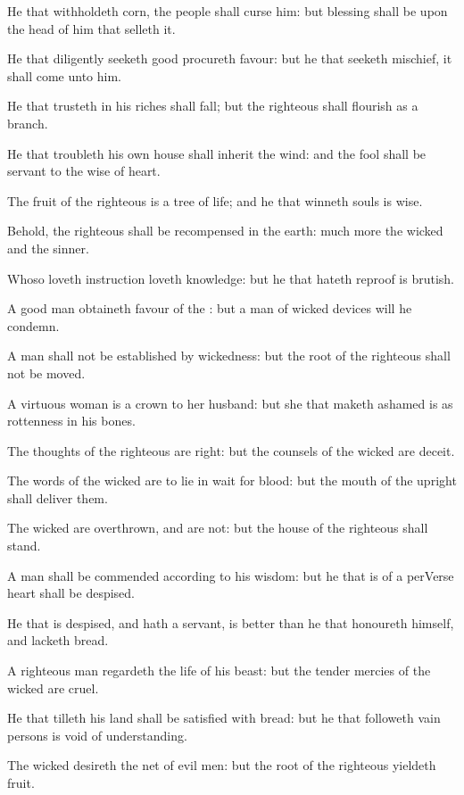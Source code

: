 \Verse He that withholdeth corn, the people shall curse him: but blessing shall be upon the head of him that selleth it.

\Verse He that diligently seeketh good procureth favour: but he that seeketh mischief, it shall come unto him.

\Verse He that trusteth in his riches shall fall; but the righteous shall flourish as a branch.

\Verse He that troubleth his own house shall inherit the wind: and the fool shall be servant to the wise of heart.

\Verse The fruit of the righteous is a tree of life; and he that winneth souls is wise.

\Verse Behold, the righteous shall be recompensed in the earth: much more the wicked and the sinner.


\Chapter
\Verse Whoso loveth instruction loveth knowledge: but he that hateth reproof is brutish.

\Verse A good man obtaineth favour of the \LORD: but a man of wicked devices will he condemn.

\Verse A man shall not be established by wickedness: but the root of the righteous shall not be moved.

\Verse A virtuous woman is a crown to her husband: but she that maketh ashamed is as rottenness in his bones.

\Verse The thoughts of the righteous are right: but the counsels of the wicked are deceit.

\Verse The words of the wicked are to lie in wait for blood: but the mouth of the upright shall deliver them.

\Verse The wicked are overthrown, and are not: but the house of the righteous shall stand.

\Verse A man shall be commended according to his wisdom: but he that is of a perVerse heart shall be despised.

\Verse He that is despised, and hath a servant, is better than he that honoureth himself, and lacketh bread.

\Verse A righteous man regardeth the life of his beast: but the tender mercies of the wicked are cruel.

\Verse He that tilleth his land shall be satisfied with bread: but he that followeth vain persons is void of understanding.

\Verse The wicked desireth the net of evil men: but the root of the righteous yieldeth fruit.

